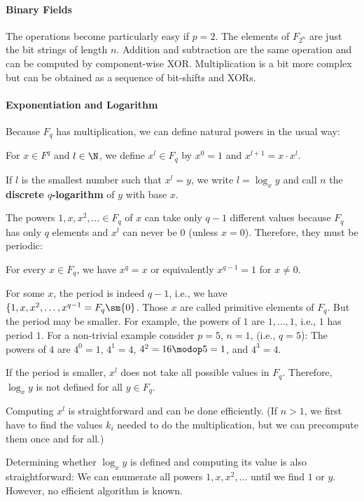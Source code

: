 \paragraph{Binary Fields}
The operations become particularly easy if $p=2$.
The elements of $F_{2^n}$ are just the bit strings of length $n$.
Addition and subtraction are the same operation and can be computed by component-wise XOR.
Multiplication is a bit more complex but can be obtained as a sequence of bit-shifts and XORs.

\paragraph{Exponentiation and Logarithm}
Because $F_q$ has multiplication, we can define natural powers in the usual way:

\begin{definition}
For $x\in F^q$ and $l\in\N$, we define $x^l\in F_q$ by $x^0=1$ and $x^{l+1}=x\cdot x^l$.

If $l$ is the smallest number such that $x^l=y$, we write $l=\log_x y$ and call $n$ the \textbf{discrete $q$-logarithm} of $y$ with base $x$.
\end{definition}

The powers $1,x,x^2,\ldots\in F_q$ of $x$ can take only $q-1$ different values because $F_q$ has only $q$ elements and $x^l$ can never be $0$ (unless $x=0$).
Therefore, they must be periodic:

\begin{theorem}
For every $x\in F_q$, we have $x^q=x$ or equivalently $x^{q-1}=1$ for $x\neq 0$.
\end{theorem}

For some $x$, the period is indeed $q-1$, i.e., we have $\{1,x,x^2,\ldots,x^{q-1}=F_q\sm\{0\}$.
Those $x$ are called primitive elements of $F_q$.
But the period may be smaller.
For example, the powers of $1$ are $1,\ldots,1$, i.e., $1$ has period $1$.
For a non-trivial example consider $p=5$, $n=1$, (i.e., $q=5$): The powers of $4$ are $4^0=1$, $4^1=4$, $4^2=16\modop 5=1$, and $4^3=4$.

If the period is smaller, $x^l$ does not take all possible values in $F_q$.
Therefore, $\log_x y$ is not defined for all $y\in F_q$.
\medskip

Computing $x^l$ is straightforward and can be done efficiently.
(If $n>1$, we first have to find the values $k_i$ needed to do the multiplication, but we can precompute them once and for all.)

Determining whether $\log_x y$ is defined and computing its value is also straightforward: We can enumerate all powers $1,x,x^2,\ldots$ until we find $1$ or $y$.
However, no efficient algorithm is known.
